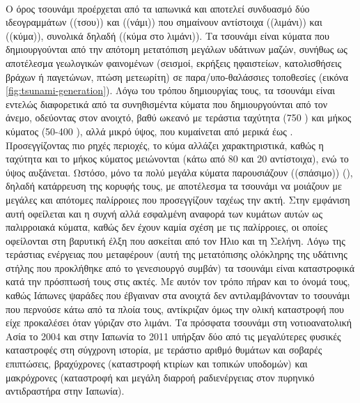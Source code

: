 \paragraph{} Ο όρος τσουνάμι προέρχεται από τα ιαπωνικά και αποτελεί συνδυασμό δύο
ιδεογραμμάτων  ((τσου)) και ((νάμι)) που σημαίνουν αντίστοιχα ((λιμάνι)) και
((κύμα)), συνολικά δηλαδή ((κύμα στο λιμάνι)). Τα τσουνάμι είναι κύματα που δημιουργούνται
από την απότομη μετατόπιση μεγάλων υδάτινων μαζών, συνήθως ως αποτέλεσμα γεωλογικών
φαινομένων (σεισμοί, εκρήξεις ηφαιστείων, κατολισθήσεις βράχων ή παγετώνων, πτώση
μετεωρίτη) σε παρα/υπο-θαλάσσιες τοποθεσίες (εικόνα \ref{fig:tsunami-generation}). Λόγω
του τρόπου δημιουργίας τους, τα τσουνάμι είναι εντελώς διαφορετικά από τα συνηθισμέντα
κύματα που δημιουργούνται από τον άνεμο, οδεύοντας στον ανοιχτό, βαθύ ωκεανό με τεράστια
ταχύτητα (750 ) και μήκος κύματος (50-400 ), αλλά μικρό ύψος, που
κυμαίνεται από μερικά  έως . Προσεγγίζοντας πιο ρηχές περιοχές, το κύμα
αλλάζει χαρακτηριστικά, καθώς η ταχύτητα και το μήκος κύματος μειώνονται (κάτω από 80
 και 20  αντίστοιχα), ενώ το ύψος αυξάνεται. Ωστόσο, μόνο τα πολύ μεγάλα
κύματα παρουσιάζουν ((σπάσιμο)) (), δηλαδή κατάρρευση της κορυφής τους,
με αποτέλεσμα τα τσουνάμι να μοιάζουν με μεγάλες και απότομες παλίρροιες που προσεγγίζουν
ταχέως την ακτή. Στην εμφάνιση αυτή οφείλεται και η συχνή αλλά εσφαλμένη αναφορά των
κυμάτων αυτών ως παλιρροιακά κύματα, καθώς δεν έχουν καμία σχέση με τις παλίρροιες, οι
οποίες οφείλονται στη βαρυτική έλξη που ασκείται από τον Ήλιο και τη Σελήνη. Λόγω της
τεράστιας ενέργειας που μεταφέρουν (αυτή της μετατόπισης ολόκληρης της υδάτινης στήλης που
προκλήθηκε από το γενεσιουργό συμβάν) τα τσουνάμι είναι καταστροφικά κατά την πρόσπτωσή
τους στις ακτές. Με αυτόν τον τρόπο πήραν και το όνομά τους, καθώς Ιάπωνες ψαράδες που
έβγαιναν στα ανοιχτά δεν αντιλαμβάνονταν το τσουνάμι που περνούσε κάτω από τα πλοία τους,
αντίκριζαν όμως την ολική καταστροφή που είχε προκαλέσει όταν γύριζαν στο λιμάνι. Τα
πρόσφατα τσουνάμι στη νοτιοανατολική Ασία το 2004 και στην Ιαπωνία το 2011 υπήρξαν δύο από
τις μεγαλύτερες φυσικές καταστροφές στη σύγχρονη ιστορία, με τεράστιο αριθμό θυμάτων και
σοβαρές επιπτώσεις, βραχύχρονες (καταστροφή κτιρίων και τοπικών υποδομών) και μακρόχρονες
(καταστροφή και μεγάλη διαρροή ραδιενέργειας στον πυρηνικό αντιδραστήρα  στην Ιαπωνία).

